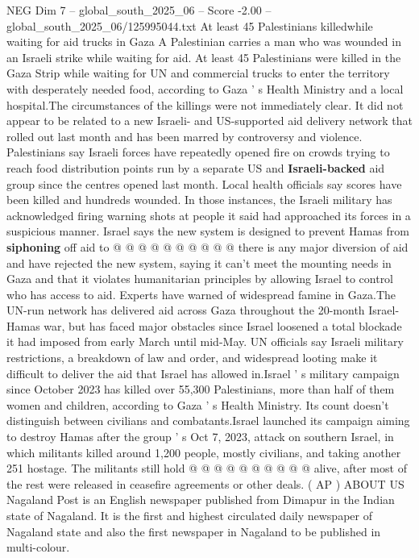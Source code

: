 \begin{textsample}{NEG Dim 7 – global\_south\_2025\_06 – Score -2.00 – global\_south\_2025\_06/125995044.txt}  \label{ex:f7_neg_058}
At least 45 Palestinians killedwhile waiting for aid trucks in Gaza A Palestinian carries a man who was wounded in an Israeli strike while waiting for aid.
At least 45 Palestinians were killed in the Gaza Strip while waiting for UN and commercial trucks to enter the territory with desperately needed food, according to Gaza ' s Health Ministry and a local hospital.The circumstances of the killings were not immediately clear.
It did not appear to be related to a new Israeli- and US-supported aid delivery network that rolled out last month and has been marred by controversy and violence.
Palestinians say Israeli forces have repeatedly opened fire on crowds trying to reach food distribution points run by a separate US and \textbf{Israeli-backed} aid group since the centres opened last month.
Local health officials say scores have been killed and hundreds wounded.
In those instances, the Israeli military has acknowledged firing warning shots at people it said had approached its forces in a suspicious manner.
Israel says the new system is designed to prevent Hamas from \textbf{siphoning} off aid to @ @ @ @ @ @ @ @ @ @ there is any major diversion of aid and have rejected the new system, saying it can't meet the mounting needs in Gaza and that it violates humanitarian principles by allowing Israel to control who has access to aid.
Experts have warned of widespread famine in Gaza.The UN-run network has delivered aid across Gaza throughout the 20-month Israel-Hamas war, but has faced major obstacles since Israel loosened a total blockade it had imposed from early March until mid-May.
UN officials say Israeli military restrictions, a breakdown of law and order, and widespread looting make it difficult to deliver the aid that Israel has allowed in.Israel ' s military campaign since October 2023 has killed over 55,300 Palestinians, more than half of them women and children, according to Gaza ' s Health Ministry.
Its count doesn't distinguish between civilians and combatants.Israel launched its campaign aiming to destroy Hamas after the group ' s Oct 7, 2023, attack on southern Israel, in which militants killed around 1,200 people, mostly civilians, and taking another 251 hostage.
The militants still hold @ @ @ @ @ @ @ @ @ @ alive, after most of the rest were released in ceasefire agreements or other deals. ( AP ) ABOUT US Nagaland Post is an English newspaper published from Dimapur in the Indian state of Nagaland.
It is the first and highest circulated daily newspaper of Nagaland state and also the first newspaper in Nagaland to be published in multi-colour.

\end{textsample}
